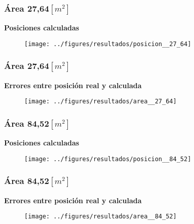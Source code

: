 \documentclass[mathserif]{beamer}
\begin{document}

\begin{frame}
\frametitle{Área 27,64$[m^2]$}

\textbf{Posiciones calculadas}

\begin{figure}
\texttt{[image: ../figures/resultados/posicion\_\_27\_64]}
\end{figure}


\end{frame}


\begin{frame}
\frametitle{Área 27,64$[m^2]$}

\textbf{Errores entre posición real y calculada}

\begin{figure}
\texttt{[image: ../figures/resultados/area\_\_27\_64]}
\end{figure}



\end{frame}


\begin{frame}
\frametitle{Área 84,52$[m^2]$}

\textbf{Posiciones calculadas}

\begin{figure}
\texttt{[image: ../figures/resultados/posicion\_\_84\_52]}
\end{figure}


\end{frame}


\begin{frame}
\frametitle{Área 84,52$[m^2]$}

\textbf{Errores entre posición real y calculada}

\begin{figure}
\texttt{[image: ../figures/resultados/area\_\_84\_52]}
\end{figure}



\end{frame}

\end{document}
